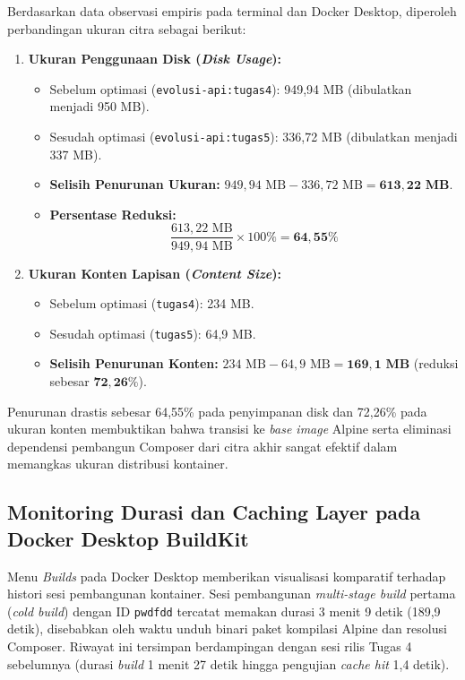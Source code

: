 Berdasarkan data observasi empiris pada terminal dan Docker Desktop, diperoleh perbandingan ukuran citra sebagai berikut:
\begin{enumerate}
    \item \textbf{Ukuran Penggunaan Disk (\textit{Disk Usage}):}
    \begin{itemize}
        \item Sebelum optimasi (\texttt{evolusi-api:tugas4}): 949,94 MB (dibulatkan menjadi 950 MB).
        \item Sesudah optimasi (\texttt{evolusi-api:tugas5}): 336,72 MB (dibulatkan menjadi 337 MB).
        \item \textbf{Selisih Penurunan Ukuran:} $949{,}94\text{ MB} - 336{,}72\text{ MB} = \mathbf{613{,}22\text{ MB}}$.
        \item \textbf{Persentase Reduksi:}
        $$\frac{613{,}22\text{ MB}}{949{,}94\text{ MB}} \times 100\% = \mathbf{64{,}55\%}$$
    \end{itemize}
    \item \textbf{Ukuran Konten Lapisan (\textit{Content Size}):}
    \begin{itemize}
        \item Sebelum optimasi (\texttt{tugas4}): 234 MB.
        \item Sesudah optimasi (\texttt{tugas5}): 64,9 MB.
        \item \textbf{Selisih Penurunan Konten:} $234\text{ MB} - 64{,}9\text{ MB} = \mathbf{169{,}1\text{ MB}}$ (reduksi sebesar $\mathbf{72{,}26\%}$).
    \end{itemize}
\end{enumerate}
Penurunan drastis sebesar 64,55\% pada penyimpanan disk dan 72,26\% pada ukuran konten membuktikan bahwa transisi ke \textit{base image} Alpine serta eliminasi dependensi pembangun Composer dari citra akhir sangat efektif dalam memangkas ukuran distribusi kontainer.

\clearpage
\subsection{Monitoring Durasi dan Caching Layer pada Docker Desktop BuildKit}
Menu \textit{Builds} pada Docker Desktop memberikan visualisasi komparatif terhadap histori sesi pembangunan kontainer. Sesi pembangunan \textit{multi-stage build} pertama (\textit{cold build}) dengan ID \texttt{pwdfdd} tercatat memakan durasi 3 menit 9 detik (189,9 detik), disebabkan oleh waktu unduh binari paket kompilasi Alpine dan resolusi Composer. Riwayat ini tersimpan berdampingan dengan sesi rilis Tugas 4 sebelumnya (durasi \textit{build} 1 menit 27 detik hingga pengujian \textit{cache hit} 1,4 detik).

